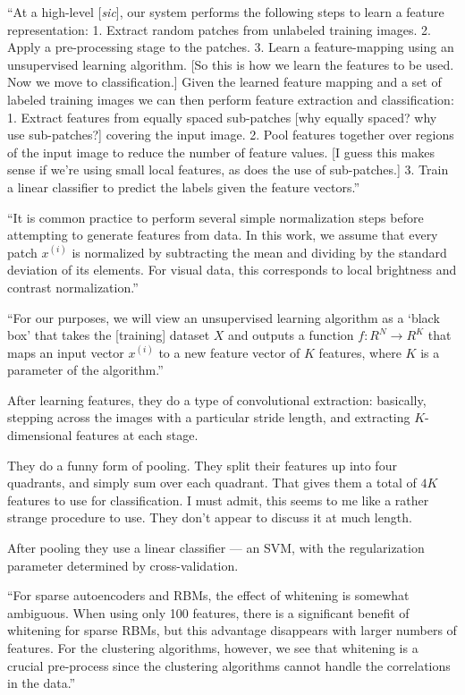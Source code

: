 \documentclass[12pt]{report}
\begin{document}
``At a high-level [\emph{sic}], our system performs the following
steps to learn a feature representation: 1. Extract random patches
from unlabeled training images.  2. Apply a pre-processing stage to
the patches. 3. Learn a feature-mapping using an unsupervised learning
algorithm. [So this is how we learn the features to be used.  Now we
move to classification.]  Given the learned feature mapping and a set
of labeled training images we can then perform feature extraction and
classification: 1. Extract features from equally spaced sub-patches
[why equally spaced? why use sub-patches?] covering the input image.
2. Pool features together over regions of the input image to reduce
the number of feature values. [I guess this makes sense if we're using
small local features, as does the use of sub-patches.]  3. Train a
linear classifier to predict the labels given the feature vectors.''

``It is common practice to perform several simple normalization steps
before attempting to generate features from data.  In this work, we
assume that every patch $x^{(i)}$ is normalized by subtracting the
mean and dividing by the standard deviation of its elements.  For
visual data, this corresponds to local brightness and contrast
normalization.''

``For our purposes, we will view an unsupervised learning algorithm as
a `black box' that takes the [training] dataset $X$ and outputs a
function $f : R^N \rightarrow R^K$ that maps an input vector $x^{(i)}$
to a new feature vector of $K$ features, where $K$ is a parameter of
the algorithm.''  

After learning features, they do a type of convolutional extraction:
basically, stepping across the images with a particular stride length,
and extracting $K$-dimensional features at each stage.

They do a funny form of pooling.  They split their features up into
four quadrants, and simply sum over each quadrant.  That gives them a
total of $4K$ features to use for classification.  I must admit, this
seems to me like a rather strange procedure to use.  They don't appear
to discuss it at much length. 

After pooling they use a linear classifier --- an SVM, with the
regularization parameter determined by cross-validation.

``For sparse autoencoders and RBMs, the effect of whitening is
somewhat ambiguous.  When using only 100 features, there is a
significant benefit of whitening for sparse RBMs, but this advantage
disappears with larger numbers of features.  For the clustering
algorithms, however, we see that whitening is a crucial pre-process
since the clustering algorithms cannot handle the correlations in the
data.''
\end{document}
